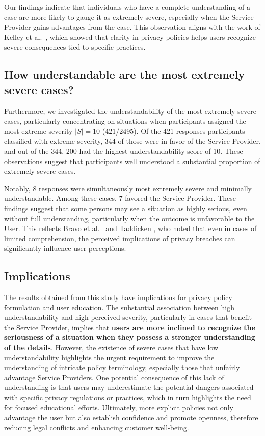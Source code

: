 {Our findings indicate that individuals who have a complete understanding of a case are more likely to gauge it as extremely severe, especially when the Service Provider gains advantages from the case.
This observation aligns with the work of Kelley et al.~\cite{kelley2010standardizing}, which showed that clarity in privacy policies helps users recognize severe consequences tied to specific practices.

\subsection{How understandable are the most extremely severe cases?}

Furthermore, we investigated the understandability of the most extremely severe cases, particularly concentrating on situations when participants assigned the most extreme severity $|S|=10$ (421/2495).
Of the 421 responses participants classified with extreme severity, 344 of those were in favor of the Service Provider, and out of the 344, 200 had the highest understandability score of 10.
These observations suggest that participants well understood a substantial proportion of extremely severe cases.

Notably, 8 responses were simultaneously most extremely severe and minimally understandable.
Among these cases, 7 favored the Service Provider.
These findings suggest that some persons may see a situation as highly serious, even without full understanding, particularly when the outcome is unfavorable to the User.
This reflects Bravo et al.~\cite{bravo2010bridging} and Taddicken \cite{taddicken2014privacy}, who noted that even in cases of limited comprehension, the perceived implications of privacy breaches can significantly influence user perceptions.

} %

\subsection{Implications}

The results obtained from this study have implications for privacy policy formulation and user education.
The substantial association between high understandability and high perceived severity, particularly in cases that benefit the Service Provider, implies that \textbf{users are more inclined to recognize the seriousness of a situation when they possess a stronger understanding of the details}.
However, the existence of severe cases that have low understandability highlights the urgent requirement to improve the understanding of intricate policy terminology, especially those that unfairly advantage Service Providers.
One potential consequence of this lack of understanding is that users may underestimate the potential dangers associated with specific privacy regulations or practices, which in turn highlights the need for focused educational efforts.
Ultimately, more explicit policies not only advantage the user but also establish confidence and promote openness, therefore reducing legal conflicts and enhancing customer well-being.
